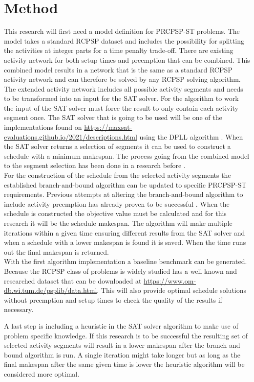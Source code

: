 \documentclass[english]{article}
\begin{document}
\section*{Method}
This research will first need a model definition for PRCPSP-ST problems. The model takes a standard RCPSP dataset and includes the possibility for splitting the activities at integer parts for a time penalty trade-off. There are existing activity network for both setup times \cite{RN13} and preemption \cite{RN21} that can be combined. This combined model results in a network that is the same as a standard RCPSP activity network and can therefore be solved by any RCPSP solving algorithm. The extended activity network includes all possible activity segments and needs to be transformed into an input for the SAT solver. For the algorithm to work the input of the SAT solver must force the result to only contain each activity segment once. The SAT solver that is going to be used will be one of the implementations found on \url{https://maxsat-evaluations.github.io/2021/descriptions.html} using the DPLL algorithm \cite{RN18}\cite{RN16}. When the SAT solver returns a selection of segments it can be used to construct a schedule with a minimum makespan. The process going from the combined model to the segment selection has been done in a research before \cite{RN1}.\\
For the construction of the schedule from the selected activity segments the established branch-and-bound algorithm \cite{RN24} can be updated to specific PRCPSP-ST requirements. Previous attempts at altering the branch-and-bound algorithm to include activity preemption has already proven to be successful \cite{RN23}. When the schedule is constructed the objective value must be calculated and for this research it will be the schedule makespan. The algorithm will make multiple iterations within a given time ensuring different results from the SAT solver and when a schedule with a lower makespan is found it is saved. When the time runs out the final makespan is returned.\\

With the first algorithm implementation a baseline benchmark can be generated. Because the RCPSP class of problems is widely studied has a well known and researched dataset \cite{RN25} that can be downloaded at \url{https://www.om-db.wi.tum.de/psplib/data.html}. This will also provide optimal schedule solutions without preemption and setup times to check the quality of the results if necessary.

A last step is including a heuristic in the SAT solver algorithm to make use of problem specific knowledge. If this research is to be successful the resulting set of selected activity segments will result in a lower makespan after the branch-and-bound algorithm is run. A single iteration might take longer but as long as the final makespan after the same given time is lower the heuristic algorithm will be considered more optimal.
\end{document}
